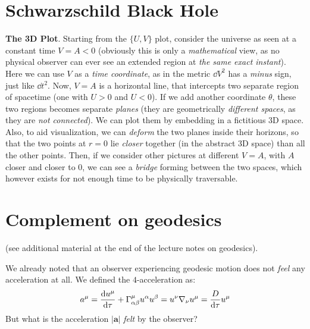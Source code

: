 \documentclass[../template.tex]{subfiles}
\begin{document}
\section{Schwarzschild Black Hole}
\textbf{The 3D Plot}. Starting from the $\{U,V\}$ plot, consider the universe as seen at a constant time $V = A < 0$ (obviously this is only a \textit{mathematical} view, as no physical observer can ever see an extended region at \textit{the same exact instant}). Here we can use $V$ as a \textit{time coordinate}, as in the metric $\dd{V}^2$ has a \textit{minus} sign, just like $\dd{t}^2$. Now, $V=A$ is a horizontal line, that intercepts two separate region of spacetime (one with $U>0$ and $U<0$). If we add another coordinate $\theta$, these two regions becomes separate \textit{planes} (they are geometrically \textit{different spaces}, as they are \textit{not connected}). We can plot them by embedding in a fictitious 3D space. Also, to aid visualization, we can \textit{deform} the two planes inside their horizons, so that the two points at $r=0$ lie \textit{closer} together (in the abstract 3D space) than all the other points. Then, if we consider other pictures at different $V=A$, with $A$ closer and closer to $0$, we can see a \textit{bridge} forming between the two spaces, which however exists for not enough time to be physically traversable.

\section{Complement on geodesics}
(see additional material at the end of the lecture notes on geodesics).


We already noted that an observer experiencing geodesic motion does not \textit{feel} any acceleration at all. We defined the $4$-acceleration as:
\begin{align*}
    a^\mu = \dv{u^\mu}{\tau} + \Gamma_{\alpha \beta}^\mu u^\alpha u^\beta = u^\nu \nabla_\nu u^\mu = \frac{D}{\dd{\tau}} u^\mu
\end{align*}  
But what is the acceleration $|\bm{a}|$ \textit{felt} by the observer?
\end{document}
